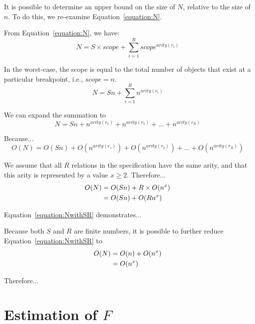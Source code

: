     It is possible to determine an upper bound on the size of $N$, relative to the size
    of $n$.  To do this, we re-examine Equation~\ref{equation:N}.

    From Equation~\ref{equation:N}, we have:
    \begin{equation*}
        N = S \times scope + \sum_{i=1}^R scope ^ {arity(r_i)}
    \end{equation*}

    In the worst-case, the scope is equal to the total number of objects that exist at a
    particular breakpoint, i.e., $scope = n$.
    \begin{equation*}
        N = S n + \sum_{i=1}^R n ^ {arity(r_i)}
    \end{equation*}

    We can expand the summation to
    \begin{equation*}
        N = S n + n^{arity(r_1)} + n^{arity(r_2)} + ... + n^{arity(r_R)}
    \end{equation*}

    Because...
    \begin{equation*}
        O(N) = O(S n) + O(n^{arity(r_1)}) + O(n^{arity(r_2)}) + ... +
        O(n^{arity(r_R)})
    \end{equation*}

    We assume that all $R$ relations in the specification have the same arity, and that this
    arity is represented by a value $x \geq 2$.  Therefore...
    \begin{align}
        O(N) & = O(S n) + R \times O(n^x) \notag \\
             & = O(S n) + O(R n^x)
        \label{equation:NwithSR}
    \end{align}

    Equation~\ref{equation:NwithSR} demonstrates...

    Because both $S$ and $R$ are finite numbers, it is possible to further reduce
    Equation~\ref{equation:NwithSR} to
    \begin{align}
        O(N) & = O(n) + O(n^x) \notag \\
             & = O(n^x)
        \label{equation:NwithoutSR}
    \end{align}

    Therefore...





\clearpage
\section{Estimation of $F$}\label{AppSec:F}

